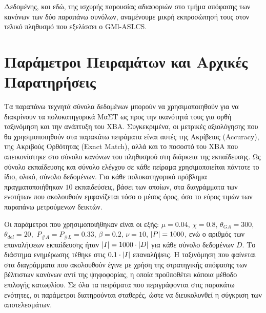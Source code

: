 Δεδομένης, και εδώ, της ισχυρής παρουσίας αδιαφοριών στο τμήμα απόφασης των κανόνων των δύο παραπάνω συνόλων, αναμένουμε μικρή εκπροσώπησή τους στον τελικό πληθυσμό που εξελίσσει ο GMl-ASLCS.



\section{Παράμετροι Πειραμάτων και Αρχικές Παρατηρήσεις}
Τα παραπάνω τεχνητά σύνολα δεδομένων μπορούν να χρησιμοποιηθούν για να διακρίνουν τα πολυκατηγορικά ΜαΣΤ ως προς την ικανότητά τους για ορθή ταξινόμηση και την ανάπτυξη του ΧΒΑ. Συγκεκριμένα, οι μετρικές αξιολόγησης που θα χρησιμοποιηθούν στα παρακάτω πειράματα είναι αυτές της Ακρίβειας (Accuracy), της Ακριβούς Ορθότητας (Exact Match), αλλά και το ποσοστό του ΧΒΑ που απεικονίστηκε στο σύνολο κανόνων του πληθυσμού στη διάρκεια της εκπαίδευσης. Ως σύνολο εκπαίδευσης και σύνολο ελέγχου σε κάθε πείραμα χρησιμοποιείται πάντοτε το ίδιο, ολικό, σύνολο δεδομένων. Για κάθε πολυκατηγορικό πρόβλημα πραγματοποιήθηκαν $10$ εκπαιδεύσεις, βάσει των οποίων, στα διαγράμματα των ενοτήτων που ακολουθούν εμφανίζεται τόσο ο μέσος όρος, όσο το εύρος τιμών των παραπάνω μετρούμενων δεικτών.

Οι παράμετροι που χρησιμοποιήθηκαν είναι οι εξής: $\mu=0.04$, $\chi = 0.8$, $\theta_{GA} = 300$, $\theta_{del}=20, $ $P_{\#A}=P_{\#L}=0.33$, $\beta = 0.2$, $\nu = 10$, $\lvert P\rvert = 1000$, ενώ ο αριθμός των επαναλήψεων εκπαίδευσης ήταν $\lvert I\rvert=1000 \cdot \lvert D\rvert$ για κάθε σύνολο δεδομένων $D$. Το διάστημα ενημέρωσης τέθηκε στις $0.1 \cdot \lvert I\rvert$ επαναλήψεις. Η ταξινόμηση που φαίνεται στα διαγράμματα που ακολουθούν έγινε με χρήση της στρατηγικής απόφασης των βέλτιστων κανόνων αντί της ψηφοφορίας, η οποία προϋποθέτει κάποια μέθοδο επιλογής κατωφλίου. Σε όλα τα πειράματα που περιγράφονται στις παρακάτω ενότητες, οι παράμετροι διατηρούνται σταθερές, ώστε να διευκολυνθεί η σύγκριση των αποτελεσμάτων.


